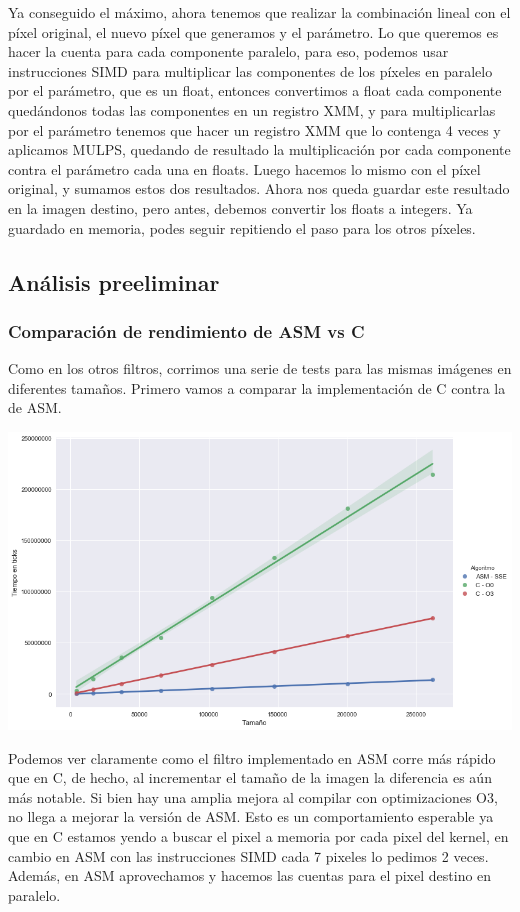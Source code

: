 Ya conseguido el máximo, ahora tenemos que realizar la combinación lineal con el píxel original, el nuevo píxel que generamos y el parámetro. Lo que queremos es hacer la cuenta para cada componente paralelo, para eso, podemos usar instrucciones SIMD para multiplicar las componentes de los píxeles en paralelo por el parámetro, que es un float, entonces convertimos a float cada componente quedándonos todas las componentes en un registro XMM, y para multiplicarlas por el parámetro tenemos que hacer un registro XMM que lo contenga 4 veces y aplicamos MULPS, quedando de resultado la multiplicación por cada componente contra el parámetro cada una en floats. Luego hacemos lo mismo con el píxel original, y sumamos estos dos resultados. Ahora nos queda guardar este resultado en la imagen destino, pero antes, debemos convertir los floats a integers. Ya guardado en memoria, podes seguir repitiendo el paso para los otros píxeles.

\subsection{Análisis preeliminar}
\subsubsection*{Comparación de rendimiento de ASM vs C}
Como en los otros filtros, corrimos una serie de tests para las mismas imágenes en diferentes tamaños. Primero vamos a comparar la implementación de C contra la de ASM.

\begin{center}
	\includegraphics[scale=0.5]{img/maxCloser_CvsASMvsO3.png}
\end{center}

Podemos ver claramente como el filtro implementado en ASM corre más rápido que en C, de hecho, al incrementar el tamaño de la imagen la diferencia es aún más notable. Si bien hay una amplia mejora al compilar con optimizaciones O3, no llega a mejorar la versión de ASM. Esto es un comportamiento esperable ya que en C estamos yendo a buscar el pixel a memoria por cada pixel del kernel, en cambio en ASM con las instrucciones SIMD cada 7 pixeles lo pedimos 2 veces. Además, en ASM aprovechamos y hacemos las cuentas para el pixel destino en paralelo.

